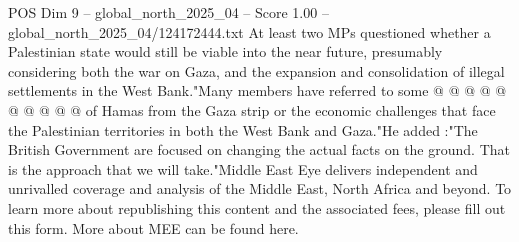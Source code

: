 \begin{textsample}{POS Dim 9 – global\_north\_2025\_04 – Score 1.00 – global\_north\_2025\_04/124172444.txt}
At least two MPs questioned whether a Palestinian state would still be viable into the near future, presumably considering both the war on Gaza, and the expansion and consolidation of illegal settlements in the West Bank."Many members have referred to some @ @ @ @ @ @ @ @ @ @ of Hamas from the Gaza strip or the economic challenges that face the Palestinian territories in both the West Bank and Gaza."He added :"The British Government are focused on changing the actual facts on the ground.
That is the approach that we will take."Middle East Eye delivers independent and unrivalled coverage and analysis of the Middle East, North Africa and beyond.
To learn more about republishing this content and the associated fees, please fill out this form.
More about MEE can be found here.

\end{textsample}
